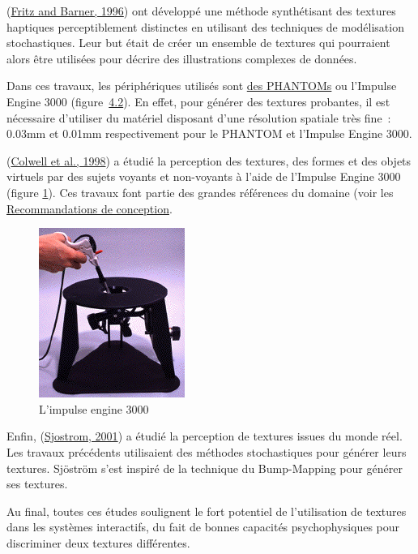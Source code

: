 \documentclass[
]{book}
\begin{document}
(\protect\hyperlink{ref-fritz1996design}{Fritz and Barner, 1996}) ont développé une
méthode synthétisant des textures haptiques perceptiblement distinctes en
utilisant des techniques de modélisation stochastiques. Leur but était de
créer un ensemble de textures qui pourraient alors être utilisées pour
décrire des illustrations complexes de données.

Dans ces travaux, les périphériques utilisés sont
\href{\ref{fig:PHANTOM}}{des PHANTOMs}
ou l'Impulse Engine 3000 (figure~\protect\hyperlink{cap:Lux5ctextquotesingleux7bux7dimpulse-engine-3000}{4.2}). En effet,
pour générer des textures
probantes, il est nécessaire d'utiliser du matériel disposant d'une
résolution spatiale très fine~: 0.03mm et 0.01mm respectivement pour le
PHANTOM et l'Impulse Engine 3000.

(\protect\hyperlink{ref-colwell1998haptic}{Colwell et al., 1998}) a étudié la
perception des textures, des formes et des objets virtuels par des sujets
voyants et non-voyants à l'aide de l'Impulse Engine 3000
(figure \ref{fig:impulse}). Ces travaux font partie des grandes références
du domaine (voir les \protect\hyperlink{recommandations-de-conception}{Recommandations de conception}.

\begin{figure}
\centering
\includegraphics{img/impulse.png}
\caption{\label{fig:impulse}L'impulse engine 3000}
\end{figure}

Enfin, (\protect\hyperlink{ref-sjostrom2001designing}{Sjostrom, 2001}) a étudié la
perception de textures issues du monde réel. Les travaux précédents
utilisaient des méthodes stochastiques pour générer leurs textures. Sjöström
s'est inspiré de la technique du Bump-Mapping pour générer ses textures.

Au final, toutes ces études soulignent le fort potentiel de l'utilisation
de textures dans les systèmes interactifs, du fait de bonnes capacités
psychophysiques pour discriminer deux textures différentes.
\end{document}
